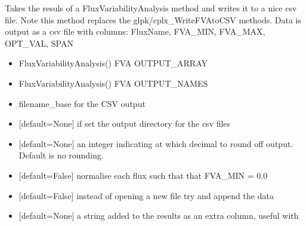 \documentclass[letterpaper,10pt,english]{sphinxmanual}
\begin{document}
\begin{fulllineitems}
\label{\detokenize{modules_doc:cbmpy.CBWrite.writeFVAdata}}
\pysigstartsignatures
{}
\pysigstopsignatures
\sphinxAtStartPar
Takes the resuls of a FluxVariabilityAnalysis method and writes it to a nice
csv file. Note this method replaces the glpk/cplx\_WriteFVAtoCSV methods. Data is output as a csv file
with columns: FluxName, FVA\_MIN, FVA\_MAX, OPT\_VAL, SPAN
\begin{itemize}
\item {} 
\sphinxAtStartPar
{} FluxVariabilityAnalysis() FVA OUTPUT\_ARRAY

\item {} 
\sphinxAtStartPar
{} FluxVariabilityAnalysis() FVA OUTPUT\_NAMES

\item {} 
\sphinxAtStartPar
{} filename\_base for the CSV output

\item {} 
\sphinxAtStartPar
{} {[}default=None{]} if set the output directory for the csv files

\item {} 
\sphinxAtStartPar
{} {[}default=None{]} an integer indicating at which decimal to round off output. Default is no rounding.

\item {} 
\sphinxAtStartPar
{} {[}default=False{]} normalise each flux such that that FVA\_MIN = 0.0

\item {} 
\sphinxAtStartPar
{} {[}default=False{]} instead of opening a new file try and append the data

\item {} 
\sphinxAtStartPar
{} {[}default=None{]} a string added to the results as an extra column, useful with 

\end{itemize}

\end{fulllineitems}
\end{document}
